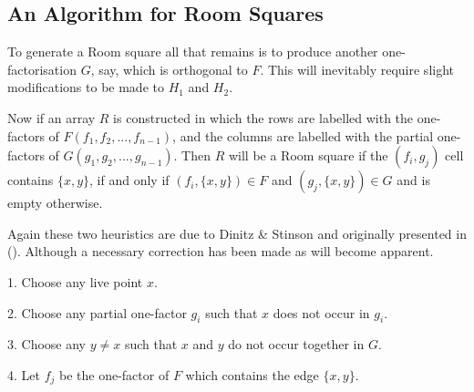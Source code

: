 \documentclass[
  11pt,
  a4paper]{book}
\begin{document}
\hypertarget{an-algorithm-for-room-squares}{%
\subsection{An Algorithm for Room Squares}\label{an-algorithm-for-room-squares}}

To generate a Room square all that remains is to produce
another one-factorisation \(G\), say, which is orthogonal to
\(F\). This will inevitably require slight modifications to
be made to \(H_1\) and \(H_2\).

Now if an array \(R\) is constructed in which the rows are
labelled with the one-factors of \(F(f_1,f_2,...,f_{n-1})\),
and the columns are labelled with the partial one-factors
of \(G(g_1,g_2,...,g_{n-1})\). Then \(R\) will be a Room square
if the \((f_i,g_j)\) cell contains \(\{x,y\}\), if and only if
\((f_i,\{x,y\}) \in F\) and \((g_j,\{x,y\}) \in G\) and is empty
otherwise.

Again these two heuristics are due to Dinitz \& Stinson and
originally presented in (\textcite{dinitz_hill-climbing_1987}).
Although a necessary correction has been made as will
become apparent.

\begin{algorithm}[H]
  1. Choose any live point $x$.

  2. Choose any partial one-factor $g_i$ such that $x$ does
     not occur in $g_i$.

  3. Choose any $y \neq x$ such that $x$ and $y$ do not occur
     together in $G$.

  4. Let $f_j$ be the one-factor of $F$ which contains the 
     edge $\{x, y\}$.
     
\caption{$OH_1$}
\end{algorithm}
\end{document}
